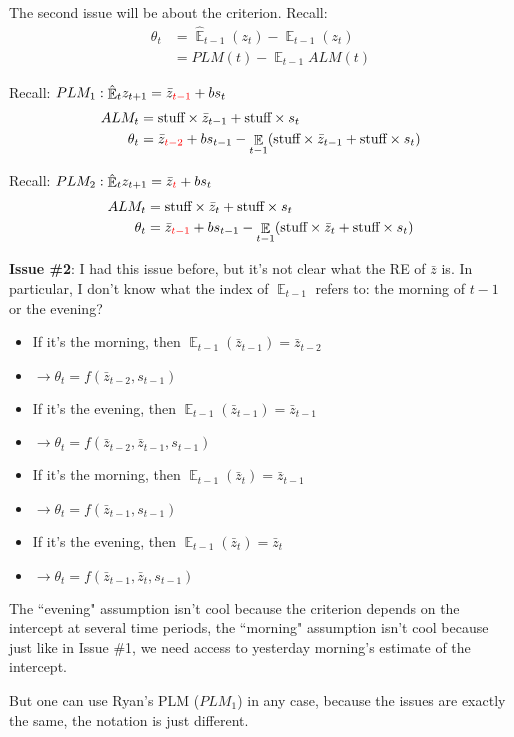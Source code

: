 \documentclass[11pt]{article}
\renewcommand{\[}{\begin{equation}}
\renewcommand{\]}{\end{equation}}
\DeclareMathOperator{\E}{\mathbb{E}}
\begin{document}
The second issue will be about the criterion. Recall:
\begin{align*}
\theta_t &=  \hat{\E}_{t-1}(z_{t}) - \E_{t-1}(z_{t})  \\
& = PLM(t) - \E_{t-1}ALM(t)
\end{align*}
\begin{multicols}{2}
 Recall: $PLM_1: \hat{\E}_t z_{t+1} = \bar{z}_{\color{red}{t-1}} + bs_t$
\begin{align*}
ALM_t & = \text{stuff} \times \bar{z}_{t-1} + \text{stuff} \times s_t \\
\theta_t &= \bar{z}_{\color{red}{t-2}} + bs_{t-1} - \E_{t-1}( \text{stuff} \times \bar{z}_{t-1} + \text{stuff} \times s_t)
\end{align*}

\columnbreak
Recall: $PLM_2: \hat{\E}_t z_{t+1} = \bar{z}_{\color{red}{t}} + bs_t$
\begin{align*}
ALM_t & = \text{stuff} \times \bar{z}_{t} + \text{stuff} \times s_t \\
\theta_t &= \bar{z}_{\color{red}{t-1}} + bs_{t-1} - \E_{t-1}( \text{stuff} \times \bar{z}_{t} + \text{stuff} \times s_t)
\end{align*}
\end{multicols}
\textbf{Issue \#2}: I had this issue before, but it's not clear what the RE of $\bar{z}$ is. In particular, I don't know what the index of $\E_{t-1}$ refers to: the morning of $t-1$ or the evening?
\begin{multicols}{2}
\begin{itemize}
\item If it's the morning, then $ \E_{t-1}(\bar{z}_{t-1}) =  \bar{z}_{t-2}$
\item[] $\rightarrow \theta_t = f(\bar{z}_{t-2}, s_{t-1})$
\item If it's the evening, then $ \E_{t-1}(\bar{z}_{t-1}) =  \bar{z}_{t-1}$
\item[] $\rightarrow \theta_t = f(\bar{z}_{t-2}, \bar{z}_{t-1}, s_{t-1})$
\end{itemize}

\columnbreak
\begin{itemize}
\item If it's the morning, then $ \E_{t-1}(\bar{z}_{t}) =  \bar{z}_{t-1}$
\item[] $\rightarrow \theta_t = f(\bar{z}_{t-1}, s_{t-1})$
\item If it's the evening, then $ \E_{t-1}(\bar{z}_{t}) =  \bar{z}_{t}$
\item[] $\rightarrow \theta_t = f(\bar{z}_{t-1}, \bar{z}_{t}, s_{t-1})$
\end{itemize}
\end{multicols}
The ``evening" assumption isn't cool because the criterion depends on the intercept at several time periods, the ``morning" assumption isn't cool because just like in Issue \#1, we need access to yesterday morning's estimate of the intercept.

But one can use Ryan's PLM ($PLM_1$) in any case, because the issues are exactly the same, the notation is just different. 
\end{document}
